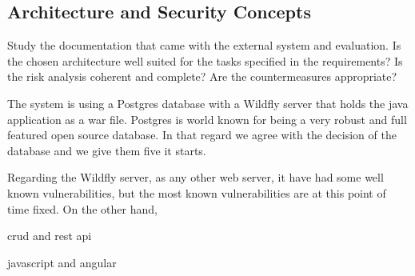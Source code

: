 \subsection{Architecture and Security Concepts}

Study the documentation that came with the external system and
evaluation.
Is the chosen architecture well suited for the tasks specified in the 
requirements?  Is the risk analysis coherent and complete?   Are the
countermeasures appropriate?

The system is using a Postgres database with a Wildfly server that holds the java application as a war file. Postgres is world known for being  a very robust and full featured open source database. In that regard we agree with the decision of the database and we give them five it starts.

Regarding the Wildfly server, as any other web server, it have had some well known vulnerabilities, but the most known vulnerabilities are at this point of time fixed. On the other hand, 

crud and rest api

javascript and angular
